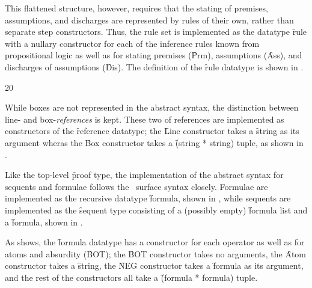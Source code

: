 \documentclass[BA.tex]{subfiles}
\begin{document}
 This flattened structure, however, requires that the stating
 of premises, assumptions, and discharges are represented by rules of their
 own, rather than separate step constructors. Thus, the rule set is 
 implemented as the datatype \f{rule} with a nullary constructor for each
 of the inference rules known from propositional logic as well as for
 stating premises (\f{Prm}), assumptions (\f{Ass}), and discharges of 
 assumptions (\f{Dis}). 
 The definition of the \f{rule} datatype is shown in .

{20}

While boxes are not represented in the abstract syntax, the distinction
 between line- and box-\emph{references} is kept.
 These two  of references are implemented as constructors of the 
 \f{reference} datatype; the \f{Line} 
 constructor takes a \f{string} as its argument wheras the \f{Box}
 constructor takes a \f{(string * string)} tuple, as shown in 
 .


Like the top-level \f{proof} type, the implementation of the abstract syntax
 for sequents and formulae follows the \bp\ surface syntax closely.
 Formulae are implemented as the recursive datatype \f{formula}, shown in
 \lst{../Proof.sml38}, while sequents are implemented as the \f{sequent} 
 type consisting of a (possibly empty) \f{formula list} and a \f{formula},
 shown in \lst{../Proof.sml2626}.


 As  shows, the \f{formula} datatype has a
 constructor for each 
 operator as well as for atoms and absurdity
 (\f{BOT}); the \f{BOT} constructor takes no arguments, the \f{Atom}
 constructor takes a \f{string}, the \f{NEG} constructor takes a \f{formula}
 as its argument,
 and the rest of the constructors all take a \f{(formula * formula)} tuple.

\end{document}
